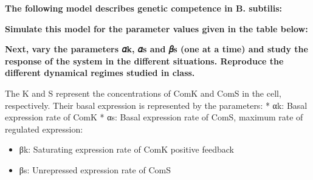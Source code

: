 \documentclass[11pt]{article}
\providecommand{\tightlist}{%
      \setlength{\itemsep}{0pt}\setlength{\parskip}{0pt}}
\begin{document}
\textbf{The following model describes genetic competence in B.
subtilis:}

    \textbf{Simulate this model for the parameter values given in the table
below:}

    \textbf{Next, vary the parameters 𝛼k, 𝛼s and 𝛽s (one at a time) and
study the response of the system in the different situations. Reproduce
the different dynamical regimes studied in class.}

    The K and S represent the concentrations of ComK and ComS in the cell,
respectively. Their basal expression is represented by the parameters: *
αk: Basal expression rate of ComK * αs: Basal expression rate of ComS,
maximum rate of regulated expression:

\begin{itemize}
\tightlist
\item
  βk: Saturating expression rate of ComK positive feedback
\item
  βs: Unrepressed expression rate of ComS
\end{itemize}
\end{document}
